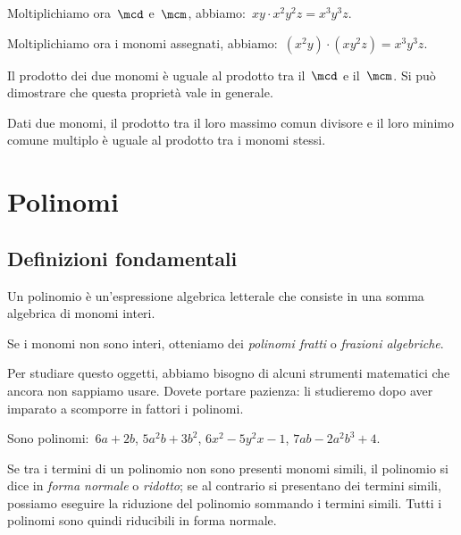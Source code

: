 Moltiplichiamo ora~$\mcd$ e~$\mcm$, abbiamo:~$xy\cdot x^{2}y^{2}z= 
x^{3}y^{3}z.$

Moltiplichiamo ora i monomi assegnati, abbiamo:~$(x^{2}y)\cdot 
(xy^{2}z)=x^{3}y^{3}z.$

Il prodotto dei due monomi è uguale al prodotto tra il~$\mcd$ e
il~$\mcm$. Si può dimostrare che questa proprietà vale in generale.

\begin{proprieta}
 Dati due monomi, il prodotto tra il loro massimo comun
divisore e il loro minimo comune multiplo è uguale al prodotto tra i
monomi stessi.
\end{proprieta}


\section{Polinomi}

\subsection{Definizioni fondamentali}
\label{subsec:10_poli_definizioni}

\begin{definizione}
Un polinomio è un'espressione algebrica letterale che consiste in una somma 
algebrica di monomi interi.
\end{definizione}

\begin{osservazione}
Se i monomi non sono interi, otteniamo dei \emph{polinomi fratti} o 
\emph{frazioni algebriche}.

Per studiare questo oggetti, abbiamo bisogno di alcuni strumenti matematici 
che ancora non sappiamo usare. 
Dovete portare pazienza: li studieremo dopo aver imparato a scomporre in 
fattori i polinomi.
\end{osservazione}


\begin{exrig}
\begin{esempio}
Sono polinomi:~$6a+2b$, $5a^2b+3b^2$, $6x^2-5y^2x-1$, $7ab-2a^2b^3+4$.
\end{esempio}
\end{exrig}

Se tra i termini di un polinomio non sono presenti monomi simili, il 
polinomio si dice in \emph{forma normale} o
\emph{ridotto}; se al contrario si presentano dei termini simili, possiamo 
eseguire la riduzione del polinomio
sommando i termini simili. Tutti i polinomi sono quindi riducibili in forma 
normale.

